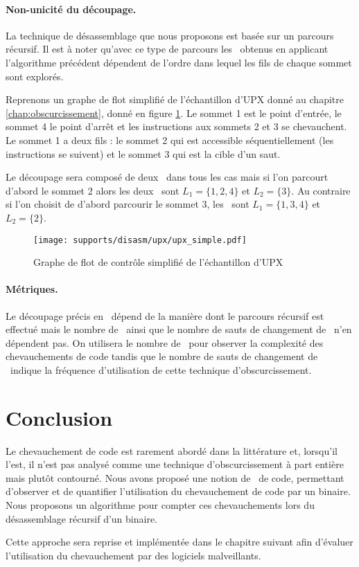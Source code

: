 \paragraph{Non-unicité du découpage.}
La technique de désassemblage que nous proposons est basée sur un parcours récursif. Il est à noter qu'avec ce type de parcours les \layers\ obtenus en applicant l'algorithme précédent dépendent de l'ordre dans lequel les fils de chaque sommet sont explorés.

Reprenons un graphe de flot simplifié de l'échantillon d'UPX donné au chapitre \ref{chap:obscurcissement}, donné en figure \ref{fig:upx_cfg_simple}. Le sommet 1 est le point d'entrée, le sommet 4 le point d'arrêt et les instructions aux sommets 2 et 3 se chevauchent. Le sommet 1 a deux fils : le sommet 2 qui est accessible séquentiellement (les instructions se suivent) et le sommet 3 qui est la cible d'un saut.

Le découpage sera composé de deux \layers\ dans tous les cas mais si l'on parcourt d'abord le sommet 2 alors les deux \layers\ sont $L_1=\{1, 2, 4\}$ et $L_2=\{3\}$. Au contraire si l'on choisit de d'abord parcourir le sommet 3, les \layers\ sont $L_1=\{1, 3, 4\}$ et $L_2=\{2\}$.

\begin{figure}
\begin{center}
\texttt{[image: supports/disasm/upx/upx\_simple.pdf]}
\end{center}
\caption{Graphe de flot de contrôle simplifié de l'échantillon d'UPX}
\label{fig:upx_cfg_simple}
\end{figure}

\paragraph{Métriques.}
Le découpage précis en \layers\ dépend de la manière dont le parcours récursif est effectué mais  le nombre de \layers\ ainsi que le nombre de sauts de changement de \layers\ n'en dépendent pas.
On utilisera le nombre de \layers\ pour observer la complexité des chevauchements de code tandis que le nombre de sauts de changement de \layers\ indique la fréquence d'utilisation de cette technique d'obscurcissement.



\section*{Conclusion}
Le chevauchement de code est rarement abordé dans la littérature et, lorsqu'il l'est, il n'est pas analysé comme une technique d'obscurcissement à part entière mais plutôt contourné.
Nous avons proposé une notion de \layer\ de code, permettant d'observer et de quantifier l'utilisation du chevauchement de code par un binaire. Nous proposons un algorithme pour compter ces chevauchements lors du désassemblage récursif d'un binaire.

Cette approche sera reprise et implémentée dans le chapitre suivant afin d'évaluer l'utilisation du chevauchement par des logiciels malveillants.

